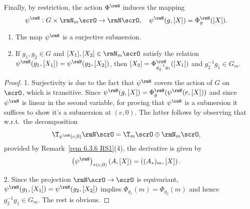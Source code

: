 Finally, by restriction, the action $\Phi^\rmN$ induces the mapping
\[\psi^\rmN:G\times \rmN_m\scrO\to \rmN \scrO,\quad \psi^\rmN(g,[X])=\Phi^\rmN_g([X]).\label{eq 6.4.4 RS1}\]

\begin{lem}[{{\cite[Lem.~6.4.6]{RS1}}}]\label{lem 6.4.6 RS1}
    \begin{enumerate}
        \item The map $\psi^\rmN$ is a surjective submersion.
        \item If $g_1,g_2\in G$ and $[X_1],[X_2]\in \rmN_m\scrO$ satisfy the relation $\psi^\rmN(g_1,[X_1])=\psi^\rmN(g_2,[X_2])$, then $[X_2]=\Phi^\rmN_{g_2^{-1}g_1}([X_1])$ and $g_2^{-1}g_1\in G_m$.
    \end{enumerate}
\end{lem}
\begin{proof}
    1. Surjectivity is due to the fact that $\psi^\rmN$ covers the action of $G$ on $\scrO$, which is transitive. Since $\psi^\rmN(g,[X])=\Phi^\rmN_g(\psi^\rmN(e,[X]))$ and since $\psi^\rmN$ is linear in the second variable, for proving that $\psi^\rmN$ is a submersion it suffices to show it's a submersion at $(e,0)$. The latter follows by observing that w.r.t.\ the decomposition 
    \[\T_{\psi^\rmN(e,0)}\rmN \scrO=\T_m \scrO\oplus \rmN_m \scrO,\]
    provided by Remark~\ref{rem 6.3.6 RS1}(4), the derivative is given by 
    \[\left(\psi^\rmN\right)_{\ast (e,0)}(A,[X])=\left((A_\ast)_m,[X]\right).\]

    2. Since the projection $\rmN \scrO\to \scrO$ is equivariant, $\psi^\rmN(g_1,[X_1])=\psi^\rmN(g_2,[X_2])$ implies $\Phi_{g_1}(m)=\Phi_{g_2}(m)$ and hence $g_2^{-1}g_1\in G_m$. The rest is obvious.
\end{proof}




